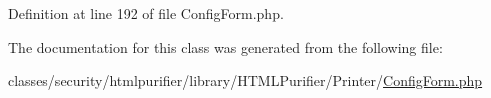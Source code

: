 Definition at line 192 of file Config\+Form.\+php.



The documentation for this class was generated from the following file\+:\begin{DoxyCompactItemize}
\item 
classes/security/htmlpurifier/library/\+H\+T\+M\+L\+Purifier/\+Printer/\hyperlink{ConfigForm_8php}{Config\+Form.\+php}\end{DoxyCompactItemize}

